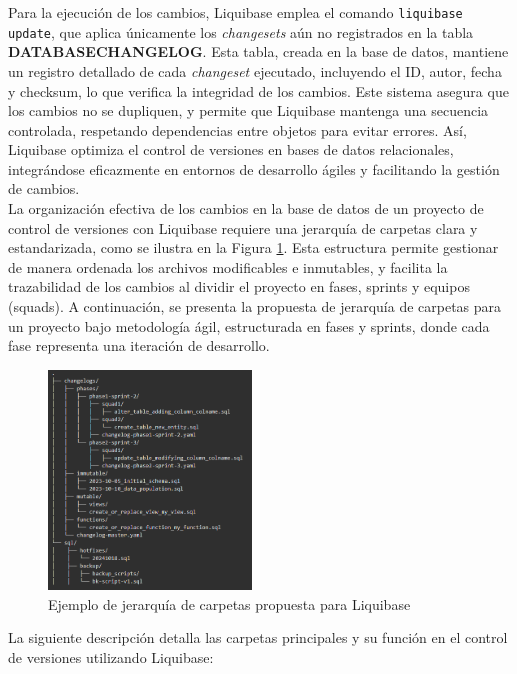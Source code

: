 \documentclass{IEEEtran}
\begin{document}
Para la ejecución de los cambios, Liquibase emplea el comando \texttt{liquibase update}, que aplica únicamente los \textit{changesets} aún no registrados en la tabla \textbf{DATABASECHANGELOG}. Esta tabla, creada en la base de datos, mantiene un registro detallado de cada \textit{changeset} ejecutado, incluyendo el ID, autor, fecha y checksum, lo que verifica la integridad de los cambios. Este sistema asegura que los cambios no se dupliquen, y permite que Liquibase mantenga una secuencia controlada, respetando dependencias entre objetos para evitar errores. Así, Liquibase optimiza el control de versiones en bases de datos relacionales, integrándose eficazmente en entornos de desarrollo ágiles y facilitando la gestión de cambios.\\

La organización efectiva de los cambios en la base de datos de un proyecto de control de versiones con Liquibase requiere una jerarquía de carpetas clara y estandarizada, como se ilustra en la Figura \ref{fig:folderHerarchyLiquibase}. Esta estructura permite gestionar de manera ordenada los archivos modificables e inmutables, y facilita la trazabilidad de los cambios al dividir el proyecto en fases, sprints y equipos (squads). A continuación, se presenta la propuesta de jerarquía de carpetas para un proyecto bajo metodología ágil, estructurada en fases y sprints, donde cada fase representa una iteración de desarrollo.

\begin{figure}[H]
    \centering
    \includegraphics[width=0.48\textwidth]{images/folderHerarchyLiquibase.png}
    \caption{Ejemplo de jerarquía de carpetas propuesta para Liquibase}
    \label{fig:folderHerarchyLiquibase}
\end{figure}

 La siguiente descripción detalla las carpetas principales y su función en el control de versiones utilizando Liquibase:
\end{document}
